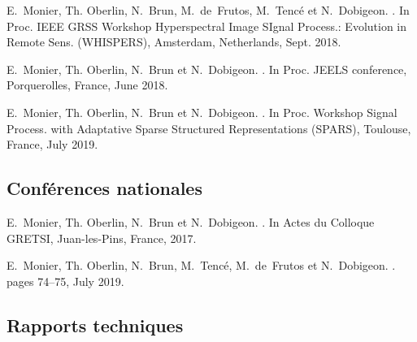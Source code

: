 \begin{fullwidth}
        E.~Monier, Th. Oberlin, N.~Brun, M.~de~Frutos, M.~Tenc\'e et N.~Dobigeon.
        .
        \newblock In Proc. IEEE GRSS Workshop Hyperspectral Image SIgnal Process.:
          Evolution in Remote Sens. (WHISPERS), Amsterdam, Netherlands, Sept. 2018.

        E.~Monier, Th. Oberlin, N.~Brun et N.~Dobigeon.
        .
        \newblock In Proc. JEELS conference, Porquerolles, France, June 2018.

        E.~Monier, Th. Oberlin, N.~Brun et N.~Dobigeon.
        .
        \newblock In Proc. Workshop Signal Process. with Adaptative Sparse Structured
          Representations (SPARS), Toulouse, France, July 2019.

    
    \subsection*{Conférences nationales}  
    

        E.~Monier, Th. Oberlin, N.~Brun et N.~Dobigeon.
        .
        \newblock In Actes du Colloque GRETSI, Juan-les-Pins, France, 2017.

        E.~Monier, Th. Oberlin, N.~Brun, M.~Tenc\'e, M.~de~Frutos et N.~Dobigeon.
        .
        \newblock pages 74--75, July 2019.


    
    \subsection*{Rapports techniques}


\end{fullwidth}
